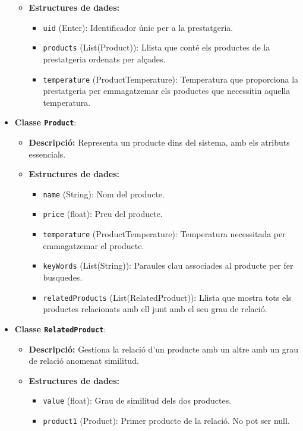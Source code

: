 \documentclass[a4paper,12pt]{report}
\begin{document}
\begin{itemize}
\begin{itemize}
			\item \textbf{Estructures de dades:}
			\begin{itemize}
				\item \texttt{uid} (Enter): Identificador únic per a la prestatgeria.
				\item \texttt{products} (List(Product)): Llista que conté els productes de la prestatgeria ordenats per alçades.
				\item \texttt{temperature} (ProductTemperature): Temperatura que proporciona la prestatgeria per emmagatzemar els productes que necessitin aquella temperatura.
			\end{itemize}
		\end{itemize}
		\item \textbf{Classe \texttt{Product}}:
		\begin{itemize}
			\item \textbf{Descripció:} Representa un producte dins del sistema, amb els atributs essencials.
			\item \textbf{Estructures de dades:}
			\begin{itemize}
				\item \texttt{name} (String): Nom del producte.
				\item \texttt{price} (float): Preu del producte.
				\item \texttt{temperature} (ProductTemperature): Temperatura necessitada per emmagatzemar el producte.
				\item \texttt{keyWords} (List(String)): Paraules clau associades al producte per fer busquedes.
				\item \texttt{relatedProducts} (List(RelatedProduct)): Llista que mostra tots els productes relacionats amb ell junt amb el seu grau de relació.
			\end{itemize}
		\end{itemize}
		\item \textbf{Classe \texttt{RelatedProduct}}:
		\begin{itemize}
			\item \textbf{Descripció:} Gestiona la relació d'un producte amb un altre amb un grau de relació anomenat similitud.
			\item \textbf{Estructures de dades:}
			\begin{itemize}
				\item \texttt{value} (float): Grau de similitud dels dos productes.
				\item \texttt{product1} (Product): Primer producte de la relació. No pot ser null.

\end{itemize}
\end{itemize}
\end{itemize}
\end{document}
